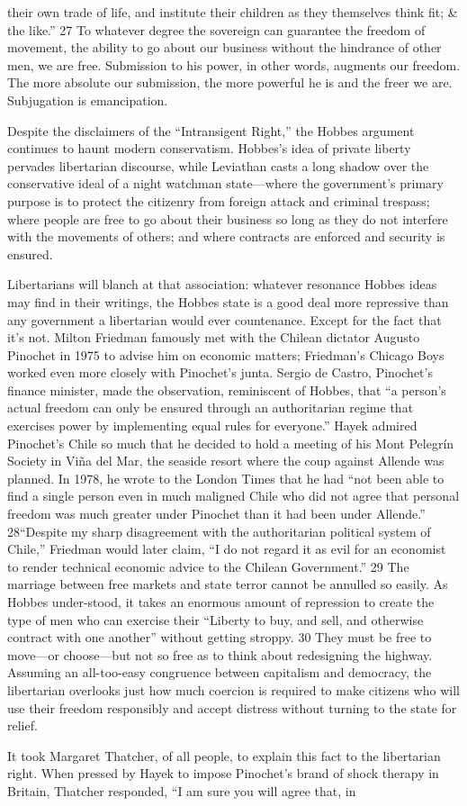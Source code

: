 their own trade of life, and institute their children as they themselves think fit; & the like.” {\color{blue} 27 } To whatever degree the sovereign can guarantee the freedom of movement, the ability to go about our business without the hindrance of other men, we are free. Submission to his power, in other words, augments our freedom. The more absolute our submission, the more powerful he is and the freer we are. Subjugation is emancipation.{\par} Despite the disclaimers of the “Intransigent Right,” the Hobbes argument continues to haunt modern conservatism. Hobbes’s idea of private liberty pervades libertarian discourse, while Leviathan casts a long shadow over the conservative ideal of a night watchman state—where the government’s primary purpose is to protect the citizenry from foreign attack and criminal trespass; where people are free to go about their business so long as they do not interfere with the movements of others; and where contracts are enforced and security is ensured.{\par} Libertarians will blanch at that association: whatever resonance Hobbes ideas may find in their writings, the Hobbes state is a good deal more repressive than any government a libertarian would ever countenance. Except for the fact that it’s not. Milton Friedman famously met with the Chilean dictator Augusto Pinochet in 1975 to advise him on economic matters; Friedman’s Chicago Boys worked even more closely with Pinochet’s junta. Sergio de Castro, Pinochet’s finance minister, made the observation, reminiscent of Hobbes, that “a person’s actual freedom can only be ensured through an authoritarian regime that exercises power by implementing equal rules for everyone.” Hayek admired Pinochet’s Chile so much that he decided to hold a meeting of his Mont Pelegrín Society in Viña del Mar, the seaside resort where the coup against Allende was planned. In 1978, he wrote to the London Times that he had “not been able to find a single person even in much maligned Chile who did not agree that personal freedom was much greater under Pinochet than it had been under Allende.” 28“Despite my sharp disagreement with the authoritarian political system of Chile,” Friedman would later claim, “I do not regard it as evil for an economist to render technical economic advice to the Chilean Government.” {\color{blue} 29 } The marriage between free markets and state terror cannot be annulled so easily. As Hobbes under-stood, it takes an enormous amount of repression to create the type of men who can exercise their “Liberty to buy, and sell, and otherwise contract with one another” without getting stroppy. {\color{blue} 30 } They must be free to move—or choose—but not so free as to think about redesigning the highway. Assuming an all-too-easy congruence between capitalism and democracy, the libertarian overlooks just how much coercion is required to make citizens who will use their freedom responsibly and accept distress without turning to the state for relief.{\par} It took Margaret Thatcher, of all people, to explain this fact to the libertarian right. When pressed by Hayek to impose Pinochet’s brand of shock therapy in Britain, Thatcher responded, “I am sure you will agree that, in 